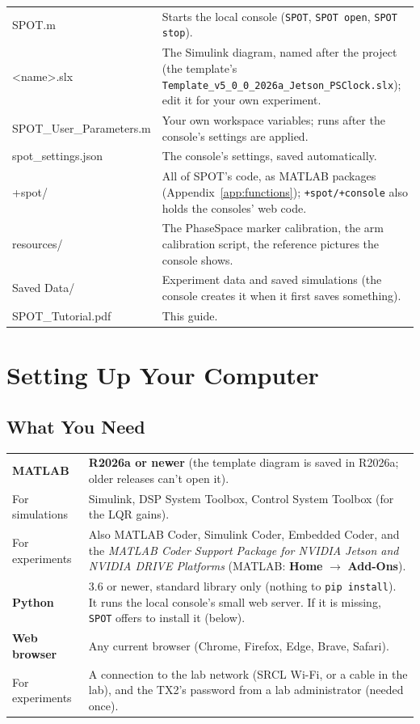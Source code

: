 \documentclass[11pt,a4paper]{article}
\newcommand{\ui}[1]{\textsf{\textbf{#1}}}
\newcommand{\pth}[1]{\texttt{#1}}
\newcommand{\fn}[1]{\texttt{#1}}
\begin{document}
\begin{xltabular}{\linewidth}{@{}>{\ttfamily}l X@{}}
\toprule
SPOT.m & Starts the local console (\fn{SPOT}, \fn{SPOT open}, \fn{SPOT stop}). \\
<name>.slx & The Simulink diagram, named after the project (the template's \pth{Template\_\allowbreak{}v5\_0\_0\_2026a\_\allowbreak{}Jetson\_\allowbreak{}PSClock.slx}); edit it for your own experiment. \\
SPOT\_User\_Parameters.m & Your own workspace variables; runs after the console's settings are applied. \\
spot\_settings.json & The console's settings, saved automatically. \\
+spot/ & All of SPOT's code, as MATLAB packages (Appendix~\ref{app:functions}); \pth{+spot/+console} also holds the consoles' web code. \\
resources/ & The PhaseSpace marker calibration, the arm calibration script, the reference pictures the console shows. \\
Saved Data/ & Experiment data and saved simulations (the console creates it when it first saves something). \\
SPOT\_Tutorial.pdf & This guide. \\
\bottomrule
\end{xltabular}

\section{Setting Up Your Computer}

\subsection{What You Need}

\begin{xltabular}{\linewidth}{@{}l X@{}}
\toprule
\textbf{MATLAB} & \textbf{R2026a or newer} (the template diagram is saved in R2026a; older releases can't open it). \\
For simulations & Simulink, DSP System Toolbox, Control System Toolbox (for the LQR gains). \\
For experiments & Also MATLAB Coder, Simulink Coder, Embedded Coder, and the \emph{MATLAB Coder Support Package for
                  NVIDIA Jetson and NVIDIA DRIVE Platforms} (MATLAB: \ui{Home} $\rightarrow$ \ui{Add-Ons}). \\
\textbf{Python} & 3.6 or newer, standard library only (nothing to \pth{pip install}). It runs the local console's small web server. If it is missing, \fn{SPOT} offers to install it (below). \\
\textbf{Web browser} & Any current browser (Chrome, Firefox, Edge, Brave, Safari). \\
For experiments & A connection to the lab network (SRCL Wi-Fi, or a cable in the lab), and the TX2's password
                  from a lab administrator (needed once). \\
\bottomrule
\end{xltabular}
\end{document}
